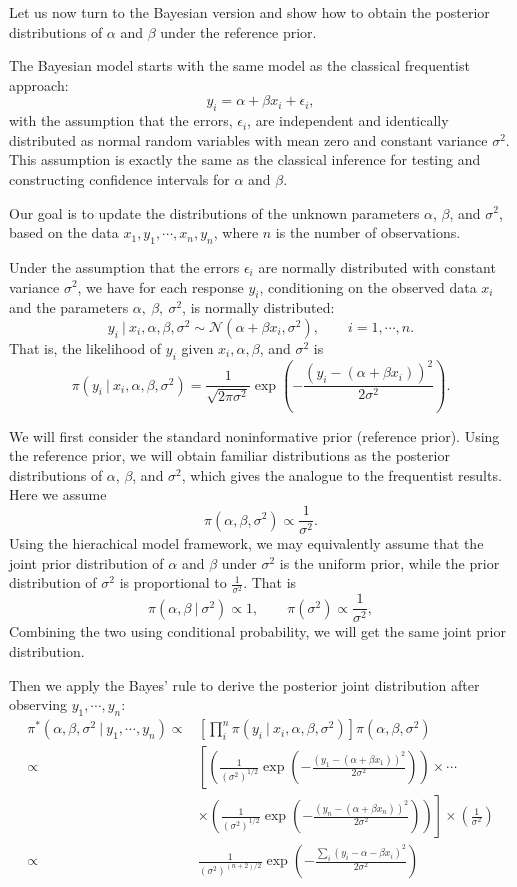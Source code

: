 \documentclass[]{book}
\theoremstyle{definition}
\theoremstyle{definition}
\theoremstyle{definition}
\theoremstyle{remark}
\begin{document}
Let us now turn to the Bayesian version and show how to obtain the
posterior distributions of \(\alpha\) and \(\beta\) under the reference
prior.

The Bayesian model starts with the same model as the classical
frequentist approach: \[ y_i = \alpha + \beta x_i + \epsilon_i, \] with
the assumption that the errors, \(\epsilon_i\), are independent and
identically distributed as normal random variables with mean zero and
constant variance \(\sigma^2\). This assumption is exactly the same as
the classical inference for testing and constructing confidence
intervals for \(\alpha\) and \(\beta\).

Our goal is to update the distributions of the unknown parameters
\(\alpha\), \(\beta\), and \(\sigma^2\), based on the data
\(x_1, y_1, \cdots, x_n, y_n\), where \(n\) is the number of
observations.

Under the assumption that the errors \(\epsilon_i\) are normally
distributed with constant variance \(\sigma^2\), we have for each
response \(y_i\), conditioning on the observed data \(x_i\) and the
parameters \(\alpha,\ \beta,\ \sigma^2\), is normally distributed:
\[ y_i~|~x_i, \alpha, \beta,\sigma^2 \sim \mathcal{N}(\alpha + \beta x_i, \sigma^2),\qquad i = 1,\cdots, n. \]
That is, the likelihood of \(y_i\) given \(x_i, \alpha, \beta\), and
\(\sigma^2\) is
\[ \pi(y_i~|~x_i, \alpha, \beta, \sigma^2) = \frac{1}{\sqrt{2\pi\sigma^2}}\exp\left(-\frac{(y_i-(\alpha+\beta  x_i))^2}{2\sigma^2}\right). \]

We will first consider the standard noninformative prior (reference
prior). Using the reference prior, we will obtain familiar distributions
as the posterior distributions of \(\alpha\), \(\beta\), and
\(\sigma^2\), which gives the analogue to the frequentist results. Here
we assume \[ \pi(\alpha, \beta, \sigma^2)\propto \frac{1}{\sigma^2}. \]
Using the hierachical model framework, we may equivalently assume that
the joint prior distribution of \(\alpha\) and \(\beta\) under
\(\sigma^2\) is the uniform prior, while the prior distribution of
\(\sigma^2\) is proportional to \(\displaystyle \frac{1}{\sigma^2}\).
That is
\[ \pi(\alpha, \beta~|~\sigma^2) \propto 1, \qquad \pi(\sigma^2) \propto \frac{1}{\sigma^2}, \]
Combining the two using conditional probability, we will get the same
joint prior distribution.

Then we apply the Bayes' rule to derive the posterior joint distribution
after observing \(y_1,\cdots, y_n\): \[
\begin{aligned}
\pi^*(\alpha, \beta, \sigma^2~|~y_1,\cdots,y_n) \propto & \left[\prod_i^n\pi(y_i~|~x_i,\alpha,\beta,\sigma^2)\right]\pi(\alpha, \beta,\sigma^2) \\
\propto & \left[\left(\frac{1}{(\sigma^2)^{1/2}}\exp\left(-\frac{(y_1-(\alpha+\beta x_1 ))^2}{2\sigma^2}\right)\right)\times\cdots \right.\\
& \left. \times \left(\frac{1}{(\sigma^2)^{1/2}}\exp\left(-\frac{(y_n-(\alpha +\beta x_n))^2}{2\sigma^2}\right)\right)\right]\times\left(\frac{1}{\sigma^2}\right)\\
\propto & \frac{1}{(\sigma^2)^{(n+2)/2}}\exp\left(-\frac{\sum_i\left(y_i-\alpha-\beta  x_i\right)^2}{2\sigma^2}\right)
\end{aligned}
\]
\end{document}
